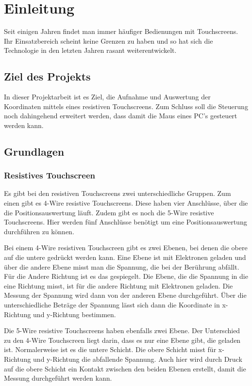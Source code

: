 \chapter{Einleitung}
Seit einigen Jahren findet man immer häufiger Bedienungen mit Touchscreens. Ihr Einsatzbereich scheint keine Grenzen zu haben und so hat sich die Technologie in den letzten Jahren rasant weiterentwickelt.


\section{Ziel des Projekts}
In dieser Projektarbeit ist es Ziel, die Aufnahme und Auswertung der Koordinaten mittels eines resistiven Touchscreens. Zum Schluss soll die Steuerung noch dahingehend erweitert werden, dass damit die Maus eines PC's gesteuert werden kann.


\section{Grundlagen}
\subsection{Resistives Touchscreen}
Es gibt bei den resistiven Touchscreens zwei unterschiedliche Gruppen. Zum einen gibt es 4-Wire resistive Touchscreens. Diese haben vier Anschlüsse, über die die Positionsauswertung läuft. 
Zudem gibt es noch die 5-Wire resistive Touchscreens. Hier werden fünf Anschlüsse benötigt um eine Positionsauswertung durchführen zu können. 

Bei einem 4-Wire resistiven Touchscreen gibt es zwei Ebenen, bei denen die obere auf die untere gedrückt werden kann. 
Eine Ebene ist mit Elektronen geladen und über die andere Ebene misst man die Spannung, die bei der Berührung abfällt. 
Für die Andere Richtung ist es das gespiegelt. Die Ebene, die  die Spannung in die eine Richtung misst, ist für die andere Richtung mit Elektronen geladen. Die Messung der Spannung wird dann von der anderen Ebene durchgeführt.
Über die unterschiedliche Beträge der Spannung lässt sich dann die Koordinate in x-Richtung und y-Richtung bestimmen. 

Die 5-Wire resistive Touchscreens haben ebenfalls zwei Ebene. Der Unterschied zu den 4-Wire Touchscreen liegt darin, dass es nur eine Ebene gibt, die geladen ist. Normalerweise ist es die untere Schicht. Die obere Schicht misst für x-Richtung und y-Richtung die abfallende Spannung.
Auch hier wird durch Druck auf die obere Schicht ein Kontakt zwischen den beiden Ebenen erstellt, damit die Messung durchgeführt werden kann. 


